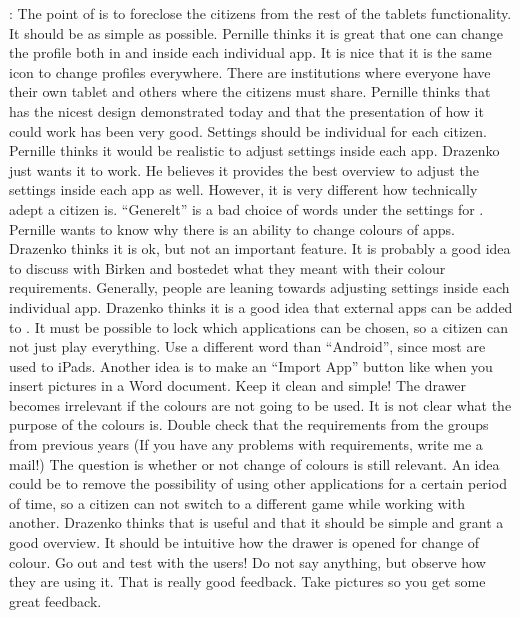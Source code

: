 \launcher: The point of \launcher is to foreclose the citizens from the rest of the tablets functionality.
It should be as simple as possible.
Pernille thinks it is great that one can change the profile both in \launcher and inside each individual app.
It is nice that it is the same icon to change profiles everywhere.
There are institutions where everyone have their own tablet and others where the citizens must share.
Pernille thinks that \launcher has the nicest design demonstrated today and that the presentation of how it could work has been very good.
Settings should be individual for each citizen.
Pernille thinks it would be realistic to adjust settings inside each app.
Drazenko just wants it to work.
He believes it provides the best overview to adjust the settings inside each app as well.
However, it is very different how technically adept a citizen is.
``Generelt'' is a bad choice of words under the settings for \giraf.
Pernille wants to know why there is an ability to change colours of apps.
Drazenko thinks it is ok, but not an important feature.
It is probably a good idea to discuss with Birken and bostedet what they meant with their colour requirements.
Generally, people are leaning towards adjusting settings inside each individual app.
Drazenko thinks it is a good idea that external apps can be added to \giraf.
It must be possible to lock which applications can be chosen, so a citizen can not just play everything.
Use a different word than ``Android'', since most are used to iPads.
Another idea is to make an ``Import App'' button like when you insert pictures in a Word document.
Keep it clean and simple!
The drawer becomes irrelevant if the colours are not going to be used.
It is not clear what the purpose of the colours is.
Double check that the requirements from the groups from previous years (If you have any problems with requirements, write me a mail!)
The question is whether or not change of colours is still relevant.
An idea could be to remove the possibility of using other applications for a certain period of time, so a citizen can not switch to a different game while working with another.
Drazenko thinks that \launcher is useful and that it should be simple and grant a good overview.
It should be intuitive how the drawer is opened for change of colour.
Go out and test with the users!
Do not say anything, but observe how they are using it. 
That is really good feedback.
Take pictures so you get some great feedback.